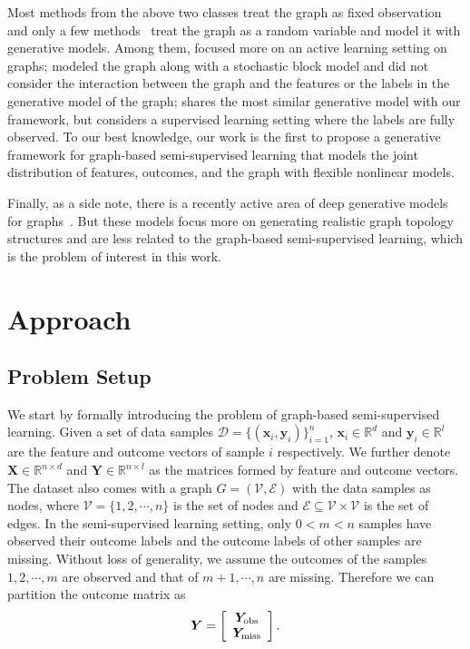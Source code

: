 \documentclass{article}
\def\vx{{\bm{x}}}
\def\vy{{\bm{y}}}
\def\mX{{\bm{X}}}
\def\mY{{\bm{Y}}}
\def\gD{{\mathcal{D}}}
\def\gE{{\mathcal{E}}}
\def\gV{{\mathcal{V}}}
\newcommand{\R}{\mathbb{R}}
\newcommand{\Ymiss}{\mY_{\rm{miss}}}
\newcommand{\Yobs}{\mY_{\rm{obs}}}
\begin{document}
Most methods from the above two classes treat the graph as fixed observation and only a few methods~\cite{ng2018bayesian,zhang2018bayesian,liu2019statistical} treat the graph as a random variable and model it with generative models. Among them, \citet{ng2018bayesian} focused more on an active learning setting on graphs; \citet{zhang2018bayesian} modeled the graph along with a stochastic block model and did not consider the interaction between the graph and the features or the labels in the generative model of the graph; \citet{liu2019statistical} shares the most similar generative model with our framework, but considers a supervised learning setting where the labels are fully observed. To our best knowledge, our work is the first to propose a generative framework for graph-based semi-supervised learning that models the joint distribution of features, outcomes, and the graph with flexible nonlinear models. 

Finally, as a side note, there is a recently active area of deep generative models for graphs~\cite{kipf2016variational,de2018molgan}. But these models focus more on generating realistic graph topology structures and are less related to the graph-based semi-supervised learning, which is the problem of interest in this work.

 \section{Approach}
\label{sec:approach}

\subsection{Problem Setup}
We start by formally introducing the problem of graph-based semi-supervised learning. Given a set of data samples $\gD = \{(\vx_i, \vy_i)\}_{i=1}^n$, $\vx_i \in \R^d$ and $\vy_i \in \R^l$ are the feature and outcome vectors of sample $i$ respectively. We further denote $\mX \in \R^{n \times d}$ and $\mY \in \R^{n \times l}$ as the matrices formed by feature and outcome vectors. The dataset also comes with a graph $G = (\gV, \gE)$ with the data samples as nodes, where $\gV = \{1, 2, \cdots, n\}$ is the set of nodes and $\gE \subseteq \gV \times \gV$ is the set of edges. In the semi-supervised learning setting, only $0 < m < n$ samples have observed their outcome labels and the outcome labels of other samples are missing. Without loss of generality, we assume the outcomes of the samples $1, 2, \cdots, m$ are observed and that of $m+1, \cdots, n$ are missing. Therefore we can partition the outcome matrix as 
$$\mY = \left[
\begin{array}{c}
	\Yobs\\
	\Ymiss
\end{array}
\right].$$
\end{document}
